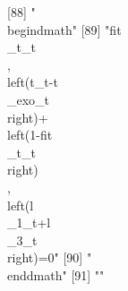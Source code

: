 [88] "\\begin{dmath}"                                                                                                                                                                                                                                                                                                                              
[89] "{{fit\\_t}_{t}}\\, \\left({t_{t}}-{{t\\_exo}_{t}}\\right)+\\left(1-{{fit\\_t}_{t}}\\right)\\, \\left({{l\\_1}_{t}}+{{l\\_3}_{t}}\\right)=0"                                                                                                                                                                                                  
[90] "\\end{dmath}"                                                                                                                                                                                                                                                                                                                                
[91] ""                                                                                                                                                                                                                                                                                                                                            
